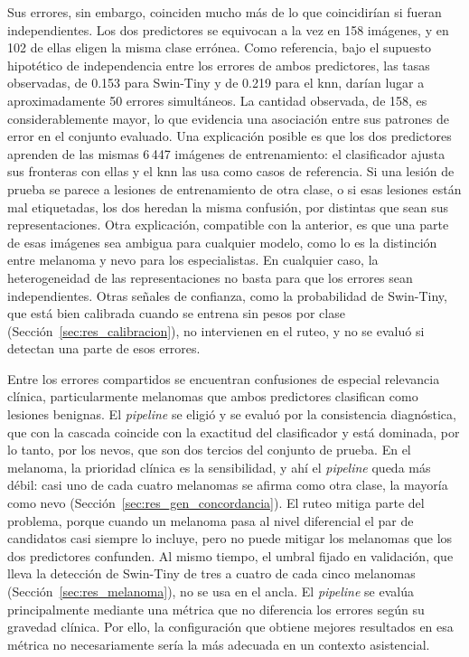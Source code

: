 Sus errores, sin embargo, coinciden mucho más de lo que coincidirían si fueran independientes. Los dos predictores se equivocan a la
vez en 158 imágenes, y en 102 de ellas eligen la misma clase errónea. Como referencia, bajo el supuesto hipotético de independencia entre los errores de ambos predictores, las tasas observadas, de 0.153 para Swin-Tiny y de 0.219 para el \gls{knn}, darían lugar a aproximadamente 50 errores simultáneos. La cantidad observada, de 158, es considerablemente mayor, lo que evidencia una asociación entre sus patrones de error en el conjunto evaluado. Una explicación posible es que los dos predictores
aprenden de las mismas 6\,447 imágenes de entrenamiento: el clasificador ajusta sus fronteras con ellas y el \gls{knn}
las usa como casos de referencia. Si una lesión de prueba se parece a lesiones de entrenamiento de otra clase, o si
esas lesiones están mal etiquetadas, los dos heredan la misma confusión, por distintas que sean sus representaciones.
Otra explicación, compatible con la anterior, es que una parte de esas imágenes sea ambigua para cualquier modelo,
como lo es la distinción entre melanoma y nevo para los especialistas. En cualquier caso, la heterogeneidad de las
representaciones no basta para que los errores sean independientes. Otras señales de confianza, como la probabilidad de
Swin-Tiny, que está bien calibrada cuando se entrena sin pesos por clase (Sección~\ref{sec:res_calibracion}), no
intervienen en el ruteo, y no se evaluó si detectan una parte de esos errores.

Entre los errores compartidos se encuentran confusiones de especial relevancia clínica, particularmente melanomas que ambos predictores clasifican como lesiones benignas. El \emph{pipeline} se eligió y se
evaluó por la consistencia diagnóstica, que con la cascada coincide con la exactitud del clasificador y está dominada,
por lo tanto, por los nevos, que son dos tercios del conjunto de prueba. En el melanoma, la prioridad clínica es la
sensibilidad, y ahí el \emph{pipeline} queda más débil: casi uno de cada cuatro melanomas se afirma como otra clase, la
mayoría como nevo (Sección~\ref{sec:res_gen_concordancia}). El ruteo mitiga parte del problema, porque cuando un
melanoma pasa al nivel diferencial el par de candidatos casi siempre lo incluye, pero no puede mitigar los melanomas
que los dos predictores confunden. Al mismo tiempo, el umbral fijado en validación, que lleva la detección de
Swin-Tiny de tres a cuatro de cada cinco melanomas (Sección~\ref{sec:res_melanoma}), no se usa en el ancla. El \emph{pipeline} se evalúa principalmente mediante una métrica que no diferencia los errores según su gravedad clínica. Por ello, la configuración que obtiene mejores resultados en esa métrica no necesariamente sería la más adecuada en un contexto asistencial.

